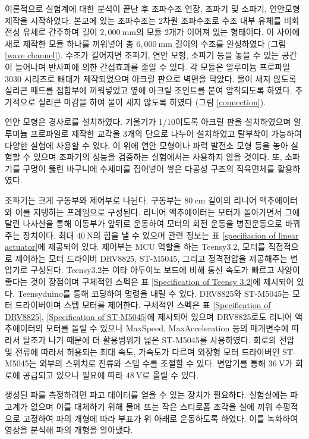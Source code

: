 \begin{summary}
    이론적으로 실험계에 대한 분석이 끝난 후 조파수조 연장, 조파기 및 소파기, 연안모형 제작을 시작하였다. 본교에 있는 조파수조는 2차원 조파수조로 수조 내부 유체를 비회전성 유체로 간주하며 길이 $2,000\mathrm{~mm}$의 모듈 2개가 이어져 있는 형태이다. 이 사이에 새로 제작한 모듈 하나를 끼워넣어 총 $6,000\mathrm{~mm}$ 길이의 수조를 완성하였다 (그림 \ref{wave channel}). 수조가 길어지면 조파기, 연안 모형, 소파기 등을 놓을 수 있는 공간이 늘어나며 반사파에 의한 간섭효과를 줄일 수 있다. 각 모듈은 알루미늄 프로파일 3030 시리즈로 뼈대가 제작되었으며 아크릴 판으로 벽면을 막았다. 물이 새지 않도록 실리콘 패드를 접합부에 끼워넣었고 옆에 아크릴 조인트를 붙여 압착되도록 하였다. 추가적으로 실리콘 마감을 하여 물이 새지 않도록 하였다 (그림 \ref{connection}).
    
    연안 모형은 경사로를 설치하였다. 기울기가 1/10이도록 아크릴 판을 설치하였으며 알루미늄 프로파일로 제작한 교각을 3개의 단으로 나누어 설치하였고 탈부착이 가능하여 다양한 실험에 사용할 수 있다. 이 위에 연안 모형이나 파력 발전소 모형 등을 놓아 실험할 수 있으며 조파기의 성능을 검증하는 실험에서는 사용하지 않을 것이다. 또, 소파기를 구멍이 뚫린 바구니에 수세미를 집어넣어 쌓은 다공성 구조의 직육면체를 활용하였다.
    
    조파기는 크게 구동부와 제어부로 나뉜다. 구동부는 $80\mathrm{~cm}$ 길이의 리니어 액추에이터와 이를 지탱하는 프레임으로 구성된다. 리니어 액추에이터는 모터가 돌아가면서 그에 달린 나사산을 통해 이동부가 앞뒤로 운동하여 모터의 회전 운동을 병진운동으로 바꿔주는 장치이다. 최대 $40\mathrm{~N}$의 힘을 낼 수 있으며 관련 정보는 표 \ref{specifiacion of linear actuator}에 제공되어 있다. 제어부는 MCU 역할을 하는 Teensy3.2, 모터를 직접적으로 제어하는 모터 드라이버 DRV8825, ST-M5045, 그리고 정격전압을 제공해주는 변압기로 구성된다. Teensy3.2는 여타 아두이노 보드에 비해 통신 속도가 빠르고 사양이 좋다는 것이 장점이며 구체적인 스펙은 표 \ref{Specification of Teensy 3.2}에 제시되어 있다. Teensyduino를 통해 코딩하여 명령을 내릴 수 있다. DRV8825와 ST-M5045는 모터 드라이버이며 스텝 모터를 제어한다. 구체적인 스펙은 표 \ref{Specification of DRV8825}, \ref{Specification of ST-M5045}에 제시되어 있으며 DRV8825로도 리니어 액추에이터의 모터를 돌릴 수 있으나 MaxSpeed, MaxAcceleration 등의 매개변수에 따라서 탈조가 나기 때문에 더 활용범위가 넓은 ST-M5045를 사용하였다. 회로의 전압 및 전류에 따라서 허용되는 최대 속도, 가속도가 다르며 외장형 모터 드라이버인 ST-M5045는 외부의 스위치로 전류와 스텝 수를 조절할 수 있다. 변압기를 통해 $36\mathrm{~V}$가 회로에 공급되고 있으나 필요에 따라 $48\mathrm{~V}$로 올릴 수 있다.

    생성된 파를 측정하려면 파고 데이터를 얻을 수 있는 장치가 필요하다. 실험실에는 파고계가 없으며 이를 대체하기 위해 물에 뜨는 작은 스티로폼 조각을 실에 끼워 수평적으로 고정하여 파의 개형에 따라 부표가 위 아래로 운동하도록 하였다. 이를 녹화하여 영상을 분석해 파의 개형을 알아냈다.


\end{summary}
